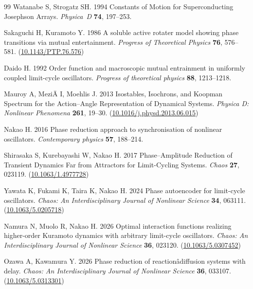 \documentclass[
amsmath,amssymb,
]{revtex4-2}
\begin{document}
\begin{thebibliography}{99}
Watanabe S, Strogatz SH. 1994  Constants of Motion for Superconducting Josephson Arrays. {\em Physica~D} \textbf{74}, 197--253.

Sakaguchi H, Kuramoto Y. 1986  A soluble active rotater model showing phase transitions via mutual entertainment. {\em Progress of Theoretical Physics} \textbf{76}, 576--581.
(\href{http://dx.doi.org/10.1143/PTP.76.576}{10.1143/PTP.76.576})

Daido H. 1992  Order function and macroscopic mutual entrainment in uniformly coupled limit-cycle oscillators. {\em Progress of theoretical physics} \textbf{88}, 1213--1218.

Mauroy A, Mezi^^c4^^87 I, Moehlis J. 2013  Isostables, Isochrons, and Koopman Spectrum for the Action--Angle Representation of Dynamical Systems. {\em Physica D: Nonlinear Phenomena} \textbf{261}, 19--30.
(\href{http://dx.doi.org/10.1016/j.physd.2013.06.015}{10.1016/j.physd.2013.06.015})

Nakao H. 2016  Phase reduction approach to synchronisation of nonlinear oscillators. {\em Contemporary physics} \textbf{57}, 188--214.

Shirasaka S, Kurebayashi W, Nakao H. 2017  Phase--Amplitude Reduction of Transient Dynamics Far from Attractors for Limit-Cycling Systems. {\em Chaos} \textbf{27}, 023119.
(\href{http://dx.doi.org/10.1063/1.4977728}{10.1063/1.4977728})

Yawata K, Fukami K, Taira K, Nakao H. 2024  Phase autoencoder for limit-cycle oscillators. {\em Chaos: An Interdisciplinary Journal of Nonlinear Science} \textbf{34}, 063111.
(\href{http://dx.doi.org/10.1063/5.0205718}{10.1063/5.0205718})

Namura N, Muolo R, Nakao H. 2026  Optimal interaction functions realizing higher-order Kuramoto dynamics with arbitrary limit-cycle oscillators. {\em Chaos: An Interdisciplinary Journal of Nonlinear Science} \textbf{36}, 023120.
(\href{http://dx.doi.org/10.1063/5.0307452}{10.1063/5.0307452})

Ozawa A, Kawamura Y. 2026  Phase reduction of reaction^^e2^^80^^93diffusion systems with delay. {\em Chaos: An Interdisciplinary Journal of Nonlinear Science} \textbf{36}, 033107.
(\href{http://dx.doi.org/10.1063/5.0313301}{10.1063/5.0313301})


\end{thebibliography}
\end{document}
